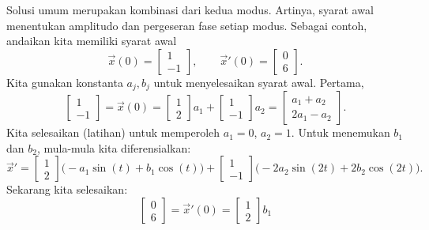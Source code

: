 \begin{example}
Solusi umum merupakan kombinasi dari kedua modus.  Artinya,
syarat awal menentukan amplitudo dan pergeseran fase setiap modus.
Sebagai contoh, andaikan kita memiliki syarat awal
\begin{equation*}
\vec{x}(0) = 
\begin{bmatrix} 1 \\ -1 \end{bmatrix}
, \qquad
\vec{x}'(0) = 
\begin{bmatrix} 0 \\ 6 \end{bmatrix} .
\end{equation*}
Kita gunakan konstanta $a_j, b_j$ untuk menyelesaikan syarat awal.  Pertama,
\begin{equation*}
\begin{bmatrix} 1 \\ -1 \end{bmatrix}
=
\vec{x}(0) = 
\begin{bmatrix} 1 \\ 2 \end{bmatrix}
a_1
+
\begin{bmatrix} 1 \\ -1 \end{bmatrix}
a_2 
=
\begin{bmatrix} a_1+a_2 \\2a_1 - a_2 \end{bmatrix} .
\end{equation*}
Kita selesaikan (latihan) untuk memperoleh $a_1 = 0$, $a_2 = 1$.
Untuk menemukan $b_1$ dan $b_2$, mula-mula kita diferensialkan:
\begin{equation*}
{\vec{x}}' = 
\begin{bmatrix} 1 \\ 2 \end{bmatrix}
\bigl( - a_1 \sin (t) + b_1 \cos (t) \bigr)
+
\begin{bmatrix} 1 \\ -1 \end{bmatrix}
\bigl( - 2a_2 \sin (2t) + 2 b_2 \cos (2t) \bigr) .
\end{equation*}
Sekarang kita selesaikan:
\begin{equation*}
\begin{bmatrix} 0 \\ 6 \end{bmatrix}
=
{\vec{x}}'(0) = 
\begin{bmatrix} 1 \\ 2 \end{bmatrix}
b_1

\end{equation*}
\end{example}
